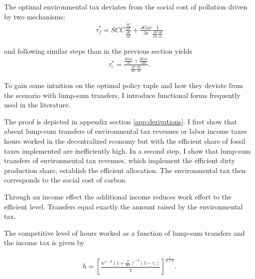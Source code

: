 The optimal environmental tax deviates from the social cost of pollution driven by two mechanisms:
\begin{align}
\tau_{f}^*= SCC{\frac{\frac{\partial C}{\partial F}}{\frac{\partial Y}{\partial F}}}+\frac{\partial Gov}{\partial s}\frac{1}{\frac{\partial Y}{\partial F}\frac{\partial F}{\partial s}}
\end{align}

and following similar steps than in the previous section yields 
\begin{align}
\tau_\iota^*=\frac{\frac{\partial Gov}{\partial s}+ \frac{\partial Gov}{\partial H}}{\frac{\partial Y}{\partial G}\frac{\partial G}{\partial s}}.
\end{align}

To gain some intuition on the optimal policy tuple and how they deviate from the scenario with lump-sum transfers,  I introduce functional forms frequently used in the literature.  


 The proof is depicted in appendix section \ref{app:derivations}. I first show that absent lump-sum transfers of environmental tax revenues or labor income taxes hours worked in the decentralized economy but with the efficient share of fossil taxes implemented are inefficiently high. In a second step, I show that lump-sum transfers of environmental tax revenues, which implement the efficient dirty production share, establish the efficient allocation.  The environmental tax then corresponds to the social cost of carbon. %
 
  Through an income effect the additional income reduces work effort to the efficient level. Transfers equal exactly the amount raised by the environmental tax. 


The competitive level of hours worked as a function of lump-sum transfers and the income tax is given by

\begin{align}
h = \left[\frac{w^{1-\theta}\left(1+\frac{T}{wh}\right)^{-\theta}(1-\tau_{\iota})}{\chi}\right]^{\frac{1}{\sigma+\theta}}.\label{eq:hopt}
\end{align}


